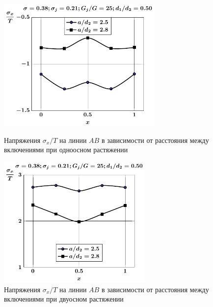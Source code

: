 \begin{russian}
\begin{figure}[h!]
\centering\footnotesize
\parbox[b]{7.5cm}{\centering\includegraphics[width=8.1cm]{periodic-oblate-inc27-a-d50-g25-t1-sig_x.pdf}
\caption{Напряжения $\sigma_x/T$ на линии $AB$ в зависимости от расстояния между включениями при одноосном растяжении
\label{f:11:43}}}\hfil\hfil
\parbox[b]{7.5cm}{\centering\includegraphics[width=7.6cm]{periodic-oblate-inc27-a-d50-g25-t2-sig_x.pdf}
\caption{Напряжения $\sigma_x/T$ на линии $AB$ в зависимости от расстояния между включениями при двуосном растяжении
\label{f:11:44}}}
\end{figure}


\end{russian}
